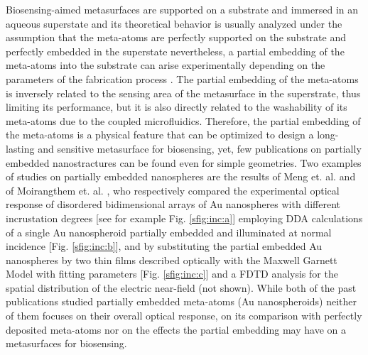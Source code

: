 Biosensing-aimed metasurfaces are supported on a substrate and immersed in an aqueous superstate \cite{estevez_trends_2014} and its theoretical behavior is usually analyzed under the assumption that the meta-atoms are perfectly supported on the substrate and perfectly embedded in the superstate  \cite{kabashin_plasmonic_2009,qiu_differential_2015,barrera1991optical,svedendahl_refractometric_2014,bedeaux_optical_2004} nevertheless, a partial embedding of the meta-atoms into the substrate can arise experimentally depending on the parameters of the fabrication process  \cite{meng_anisotropic_2015,moirangthem_enhanced_2012}. The partial embedding of the meta-atoms is inversely related to the sensing area of the metasurface in the superstrate, thus limiting its performance, but it is also directly related to the washability of its meta-atoms due to the coupled microfluidics. Therefore, the partial embedding of the meta-atoms is a physical feature that can be optimized to design a long-lasting and sensitive metasurface for biosensing, yet, few publications on partially embedded nanostractures can be found even for simple geometries. Two examples of studies on partially embedded nanospheres are the results of Meng et. al. \cite{meng_anisotropic_2015} and of Moirangthem et. al. \cite{moirangthem_enhanced_2012}, who respectively compared the experimental optical response of disordered bidimensional arrays of Au nanospheres with different incrustation degrees [see for example Fig. \ref{sfig:inc:a}] employing DDA calculations of a single Au nanospheroid partially embedded and illuminated at normal incidence [Fig. \ref{sfig:inc:b}], and by substituting the partial embedded Au nanospheres by two thin films described optically with the Maxwell Garnett Model with fitting parameters [Fig. \ref{sfig:inc:c}] and a FDTD analysis for the spatial distribution of the electric near-field (not shown). While both of the past publications studied partially embedded meta-atoms (Au nanospheroids) neither of them focuses on their overall optical response,  on its comparison with perfectly deposited meta-atoms nor on the effects the partial embedding may have on a metasurfaces for biosensing.

